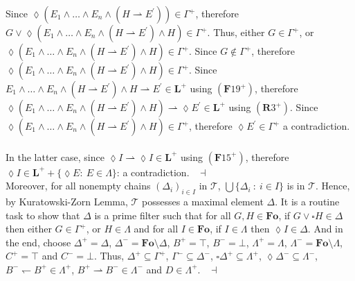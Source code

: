\documentclass[draft]{article}
\newenvironment{proof}{{\bf Proof:}}{~$\dashv$\\}
\def\Formula{\mathbf{A}}
\def\Formula{\mathbf{F}}
\def\Rule{\mathbf{R}}
\def\Fo{\mathbf{Fo}}
\def\L{\mathbf{L}}
\begin{document}
\begin{proof}
\begin{proof}
Since ${\lozenge}(E_{1}{\wedge}\ldots{\wedge}E_{n}{\wedge}(H{\rightharpoonup}E^{\prime})){\in}\Gamma^{+}$, therefore $G{\vee}{\lozenge}(E_{1}{\wedge}\ldots{\wedge}E_{n}{\wedge}(H{\rightharpoonup}E^{\prime}){\wedge}H)
%
%
%
%
%
%
%
$\linebreak$
%
%
%
%
%
%
{\in}\Gamma^{+}$.
Thus, either $G{\in}\Gamma^{+}$, or ${\lozenge}(E_{1}{\wedge}\ldots{\wedge}E_{n}{\wedge}(H{\rightharpoonup}E^{\prime}){\wedge}H){\in}\Gamma^{+}$.
Since $G{\not\in}\Gamma^{+}$, therefore ${\lozenge}(E_{1}{\wedge}\ldots{\wedge}E_{n}{\wedge}(H{\rightharpoonup}E^{\prime}){\wedge}H){\in}\Gamma^{+}$.
Since $E_{1}{\wedge}\ldots{\wedge}E_{n}{\wedge}(H{\rightharpoonup}E^{\prime}){\wedge}H{\rightharpoonup}E^{\prime}{\in}
%
%
%
%
%
%
%
$\linebreak$
%
%
%
%
%
%
\L^{+}$ using $(\Formula19^{+})$, therefore ${\lozenge}(E_{1}{\wedge}\ldots{\wedge}E_{n}{\wedge}(H{\rightharpoonup}E^{\prime}){\wedge}H){\rightharpoonup}{\lozenge}E^{\prime}{\in}\L^{+}$ using $(\Rule3^{+})$.
Since ${\lozenge}(E_{1}{\wedge}\ldots{\wedge}E_{n}{\wedge}(H{\rightharpoonup}E^{\prime}){\wedge}H){\in}\Gamma^{+}$, therefore ${\lozenge}E^{\prime}{\in}\Gamma^{+}$ a contradiction.
%
%
\\
\\
%
%
In the latter case, since ${\lozenge}I{\rightharpoonup}{\lozenge}I{\in}\L^{+}$ using $(\Formula15^{+})$, therefore ${\lozenge}I{\in}\L^{+}{+}\{{\lozenge}E:\ E{\in}\Lambda\}$: a contradiction.
%
%
\medskip
%
%
\end{proof}
%
%
Moreover, for all nonempty chains $(\Delta_{i})_{i{\in}I}$ in ${\mathcal T}$, $\bigcup\{\Delta_{i}\ :\ i{\in}I\}$ is in ${\mathcal T}$.
Hence, by Kuratowski-Zorn Lemma, ${\mathcal T}$ possesses a maximal element $\Delta$.
It is a routine task to show that $\Delta$ is a prime filter such that for all $G,H{\in}\Fo$, if $G{\vee}{\square}H{\in}\Delta$ then either $G{\in}\Gamma^{+}$, or $H{\in}\Lambda$ and for all $I{\in}\Fo$, if $I{\in}\Lambda$ then ${\lozenge}I{\in}\Delta$.
And in the end, choose $\Delta^{+}{=}\Delta$, $\Delta^{-}{=}\Fo{\setminus}\Delta$, $B^{+}{=}{\top}$, $B^{-}{=}{\bot}$, $\Lambda^{+}{=}\Lambda$, $\Lambda^{-}{=}\Fo{\setminus}\Lambda$, $C^{+}{=}{\top}$ and $C^{-}{=}{\bot}$.
Thus, $\Delta^{+}{\subseteq}
%
%
%
%
%
%
%
$\linebreak$
%
%
%
%
%
%
\Gamma^{+}$, $\Gamma^{-}{\subseteq}\Delta^{-}$, ${\square}\Delta^{+}{\subseteq}\Lambda^{+}$, ${\lozenge}\Delta^{-}{\subseteq}\Lambda^{-}$, $B^{-}{\leftharpoondown}B^{+}{\in}\Lambda^{+}$, $B^{+}{\rightharpoonup}B^{-}{\in}\Lambda^{-}$ and $D{\in}\Lambda^{+}$.
%
%
\medskip
%
%
\end{proof}
\end{document}

